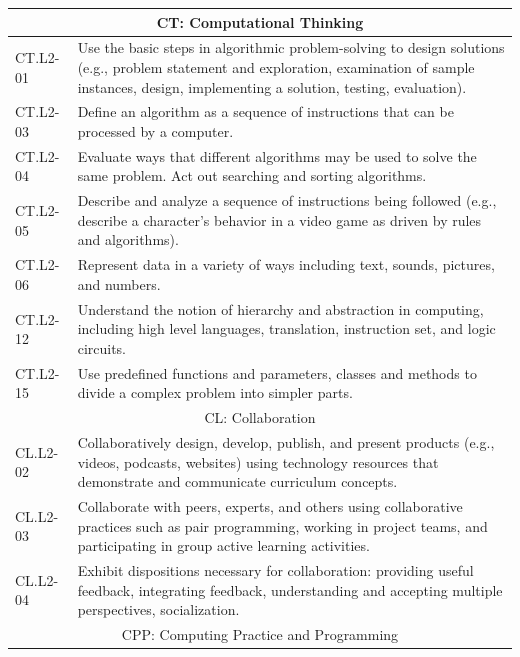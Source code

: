 \documentclass[11pt]{article}
\begin{document}
\begin{longtable}{lp{}} \\
\multicolumn{2}{c}{CT: Computational Thinking} \\ \hline
CT.L2-01 & Use the basic steps in algorithmic problem-solving to design solutions (e.g., problem statement and exploration, examination of sample instances, design, implementing a solution, testing, evaluation). \\
CT.L2-03 & Define an algorithm as a sequence of instructions that can be processed by a computer. \\
CT.L2-04  & Evaluate ways that different algorithms may be used to solve the same problem. Act out searching and sorting algorithms. \\
CT.L2-05  & Describe and analyze a sequence of instructions being followed (e.g., describe a character’s behavior in a video game as driven by rules and algorithms). \\
CT.L2-06 & Represent data in a variety of ways including text, sounds, pictures, and numbers. \\
CT.L2-12  & Understand the notion of hierarchy and abstraction in computing, including high level languages, translation, instruction set, and logic circuits. \\
CT.L2-15  & Use predefined functions and parameters, classes and methods to divide a complex problem into simpler parts. \\ \hline

\multicolumn{2}{c}{\rule{0pt}{15pt}CL: Collaboration} \\ \hline

CL.L2-02 & Collaboratively design, develop, publish, and present products (e.g., videos, podcasts, websites) using technology resources that demonstrate and communicate curriculum concepts. \\
CL.L2-03 & Collaborate with peers, experts, and others using collaborative practices such as pair programming, working in project teams, and participating in group active learning activities. \\
CL.L2-04 & Exhibit dispositions necessary for collaboration: providing useful feedback, integrating feedback, understanding and accepting multiple perspectives, socialization. \\ \hline

\multicolumn{2}{c}{\rule{0pt}{15pt}CPP: Computing Practice and Programming} \\ \hline


\end{longtable}
\end{document}
